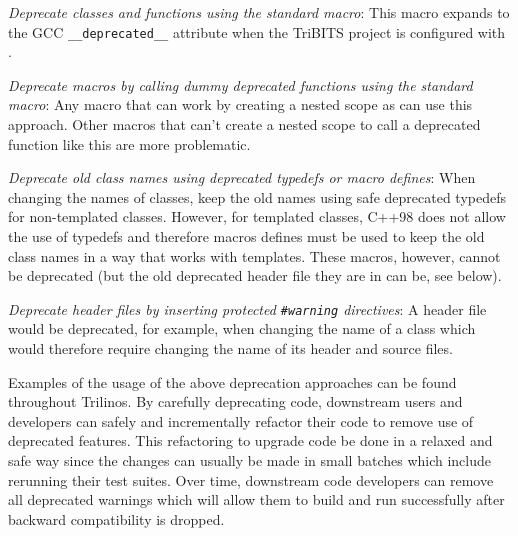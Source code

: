 \documentclass[11pt]{SANDreport}
\begin{document}
\begin{compactitem}

{}\item\textit{Deprecate classes and functions using the standard
{} macro}: This macro expands to the
GCC {}\texttt{\_\_deprecated\_\_} attribute when the TriBITS project
is configured with {}.

{}\item\textit{Deprecate macros by calling dummy deprecated functions
using the standard {} macro}: Any
macro that can work by creating a nested scope as {} can use this approach.  Other macros
that can't create a nested scope to call a deprecated function like
this are more problematic.

{}\item\textit{Deprecate old class names using deprecated typedefs or
macro defines}: When changing the names of classes, keep the old names
using safe deprecated typedefs for non-templated classes.  However,
for templated classes, C++98 does not allow the use of typedefs and
therefore macros defines must be used to keep the old class names in a
way that works with templates.  These macros, however, cannot be
deprecated (but the old deprecated header file they are in can be, see
below).

{}\item\textit{Deprecate header files by inserting protected
{}\texttt{\#warning} directives}: A header file would be deprecated,
for example, when changing the name of a class which would therefore
require changing the name of its header and source files.

\end{compactitem}

Examples of the usage of the above deprecation approaches can be found
throughout Trilinos.  By carefully deprecating code, downstream users
and developers can safely and incrementally refactor their code to
remove use of deprecated features.  This refactoring to upgrade code
be done in a relaxed and safe way since the changes can usually be
made in small batches which include rerunning their test suites.  Over
time, downstream code developers can remove all deprecated warnings
which will allow them to build and run successfully after backward
compatibility is dropped.
\end{document}
